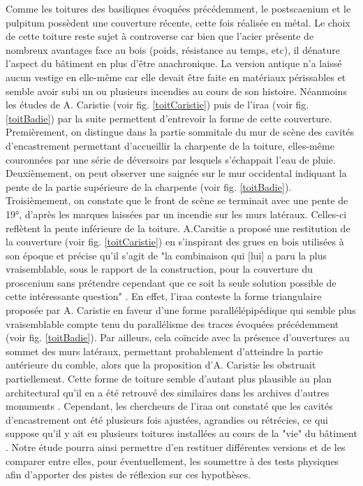 		Comme les toitures des \glspl{basilique} évoquées précédemment, le \gls{postscaenium} et le \gls{pulpitum} possèdent une couverture récente, cette fois réalisée en métal. Le choix de cette toiture reste sujet à controverse car bien que l'acier présente de nombreux avantages face au bois (poids, résistance au temps, etc), il dénature l'aspect du bâtiment en plus d'être anachronique. La version antique n'a laissé aucun vestige en elle-même car elle devait être faite en matériaux périssables et semble avoir subi un ou plusieurs incendies au cours de son histoire. Néanmoins les études de A. Caristie (voir fig. \ref{toitCaristie}) puis de l'\gls{iraa} (voir fig. \ref{toitBadie}) par la suite permettent d'entrevoir la forme de cette couverture. Premièrement, on distingue dans la partie sommitale du mur de scène des cavités d'encastrement permettant d'accueillir la charpente de la toiture, elles-même couronnées par une série de déversoirs par lesquels s’échappait l’eau de pluie. Deuxièmement, on peut observer une saignée sur le mur occidental indiquant la pente de la partie supérieure de la charpente (voir fig. \ref{toitBadie}). Troisièmement, on constate que le front de scène se terminait avec une pente de 19°, d'après les marques laissées par un incendie sur les murs latéraux. Celles-ci reflètent la pente inférieure de la toiture. A.Carsitie a proposé une restitution de la couverture (voir fig. \ref{toitCaristie}) en s'inspirant des grues en bois utilisées à son époque et précise qu'il s'agit de "la combinaison qui [lui] a paru la plus vraisemblable, sous le rapport de la construction, pour la couverture du proscenium sans prétendre cependant que ce soit la seule solution possible de cette intéressante question" \cite[p. 31]{orangeTxt}. En effet, l'\gls{iraa} \cite[p. 32]{orangeTxt} conteste la forme triangulaire proposée par A. Caristie en faveur d'une forme parallélépipédique qui semble plus vraisemblable compte tenu du parallélisme des traces évoquées précédemment (voir fig. \ref{toitBadie}). Par ailleurs, cela coïncide avec la présence d'ouvertures au sommet des murs latéraux, permettant probablement d'atteindre la partie antérieure du comble, alors que la proposition d'A. Caristie les obstruait partiellement. Cette forme de toiture semble d'autant plus plausible au plan architectural qu'il en a été retrouvé des similaires dans les archives d'autres monuments \cite[fig. 27]{orangeTxt}. Cependant, les chercheurs de l'\gls{iraa} ont constaté que les cavités d'encastrement ont été plusieurs fois ajustées, agrandies ou rétrécies, ce qui suppose qu'il y ait eu plusieurs toitures installées au cours de la "vie" du bâtiment \cite[p. 33]{orangeTxt}. Notre étude pourra ainsi permettre d'en restituer différentes versions et de les comparer entre elles, pour éventuellement, les soumettre à des tests physiques afin d'apporter des pistes de réflexion sur ces hypothèses.
		
